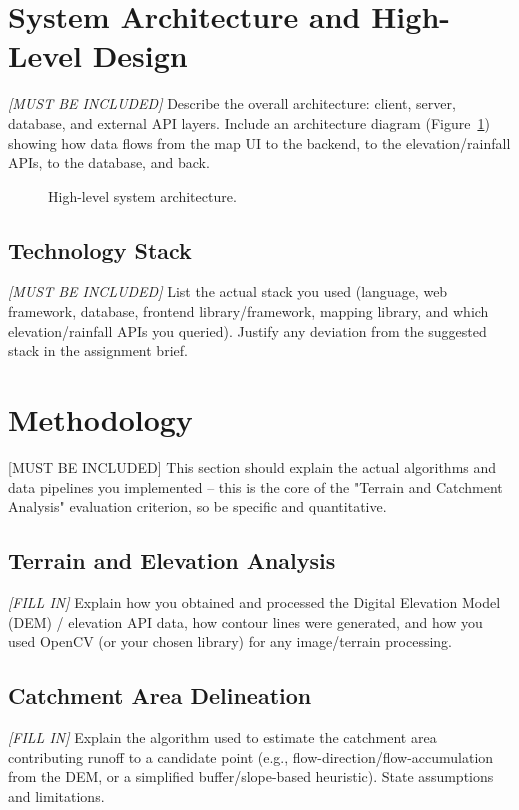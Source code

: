 \documentclass[manuscript,screen,review]{acmart}
\begin{document}
\section{System Architecture and High-Level Design}
\label{sec:architecture}
\textit{[MUST BE INCLUDED]} Describe the overall architecture: client, server,
database, and external API layers. Include an architecture diagram
(Figure~\ref{fig:architecture}) showing how data flows from the map
UI to the backend, to the elevation/rainfall APIs, to the database,
and back.

\begin{figure}[h]
  \centering
  \caption{High-level system architecture.}
  \label{fig:architecture}
\end{figure}

\subsection{Technology Stack}
\textit{[MUST BE INCLUDED]} List the actual stack you used (language, web
framework, database, frontend library/framework, mapping library,
and which elevation/rainfall APIs you queried). Justify any deviation
from the suggested stack in the assignment brief.

\section{Methodology}
\label{sec:methodology}
[MUST BE INCLUDED] This section should explain the actual algorithms and data pipelines
you implemented -- this is the core of the "Terrain and Catchment
Analysis" evaluation criterion, so be specific and quantitative.

\subsection{Terrain and Elevation Analysis}
\textit{[FILL IN]} Explain how you obtained and processed the
Digital Elevation Model (DEM) / elevation API data, how contour lines
were generated, and how you used OpenCV (or your chosen library) for
any image/terrain processing.

\subsection{Catchment Area Delineation}
\textit{[FILL IN]} Explain the algorithm used to estimate the
catchment area contributing runoff to a candidate point (e.g.,
flow-direction/flow-accumulation from the DEM, or a simplified
buffer/slope-based heuristic). State assumptions and limitations.
\end{document}
